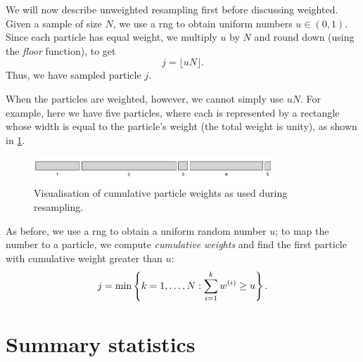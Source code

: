 We will now describe unweighted resampling first before discussing weighted. Given a sample of size $N$, we use a \gls{rng} to obtain uniform numbers $u \in (0, 1)$. Since each particle has equal weight, we multiply $u$ by $N$ and round down (using the \emph{floor} function), to get
\begin{equation}
j = \lfloor uN \rfloor.
\end{equation}
Thus, we have sampled particle $j$.


When the particles are weighted, however, we cannot simply use $uN$. For example, here we have five particles, where each is represented by a rectangle whose width is equal to the particle's weight (the total weight is unity), as shown in \cref{fig:app_weighted_resampling}.
\begin{knitrout}\small
{}\color{fgcolor}\begin{figure}[h]

{\centering \includegraphics[width=0.8\textwidth]{figure/app_weighted_resampling-1} 

}

\caption[Visualisation of cumulative particle weights as used during resampling]{Visualisation of cumulative particle weights as used during resampling.}\label{fig:app_weighted_resampling}
\end{figure}


\end{knitrout}

As before, we use a \gls{rng} to obtain a uniform random number $u$; to map the number to a particle, we compute \emph{cumulative weights} and find the first particle with cumulative weight greater than $u$:
\begin{equation}
j = \min\left\{k = 1, \ldots, N : \sum_{i=1}^k w\vi[i] \geq u\right\}.
\end{equation}




\section{Summary statistics}
\label{app:particle-summaries}

